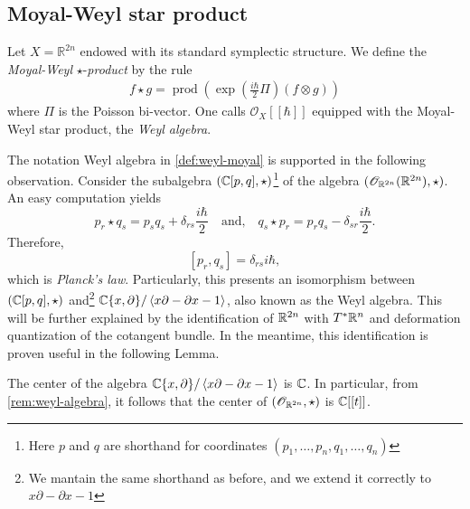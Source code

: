\subsection{Moyal-Weyl star product}
\begin{definition}\label{def:weyl-moyal}
	Let $X = \mathbb{R}^{2n}$ endowed with its standard symplectic structure. We define the \textit{Moyal-Weyl} $\star$-\textit{product} by the rule
    \begin{align}\label{eqn:weyl-moyal-free}
    	f \star g=\operatorname{prod}\left(\exp \left(\frac{i\hbar}{2}\Pi\right)(f \otimes g)\right)
    \end{align}
	where $\Pi$ is the Poisson bi-vector. One calls $\mathscr{O}_X[[\hbar]]$ equipped with the Moyal-Weyl star product, the \textit{Weyl algebra}.
\end{definition}
\begin{remark}\label{rem:weyl-algebra}
	The notation Weyl algebra in \cref{def:weyl-moyal} is supported in the following observation. Consider the subalgebra $({\mathbb C}[p,q], \star)$\footnote{Here $p$ and $q$ are shorthand for coordinates $(p_{1}, \ldots, p_{n}, q_{1}, \ldots, q_{n})$} of the algebra $(\mathscr{O}_{{\mathbb R}^{2n}}({\mathbb R}^{2n}), \star)$. An easy computation yields 
	\[
		p_{r} \star q_{s} = p_{s}q_{s} + \delta_{rs}\frac{i\hbar}{2} \quad \text{and,} \quad q_{s} \star p_{r} = p_{r}q_{s} - \delta_{sr}\frac{i\hbar}{2}.
	\]
	Therefore,
	\[
		[p_{r},q_{s}] = \delta_{rs}i\hbar,
	\]
	which is \textit{Planck’s law}. Particularly, this presents an isomorphism between $({\mathbb C}[p,q],\star)$ and\footnote{We mantain the same shorthand as before, and we extend it correctly to $x\partial - \partial x - 1$} ${\mathbb C}\{x,\partial\}/\left\langle x\partial - \partial x - 1\right\rangle$, also known as the Weyl algebra. This will be further explained by the identification of ${\mathbb R}^{2n}$ with $T^{*}{\mathbb R}^{n}$ and deformation quantization of the cotangent bundle. In the meantime, this identification is proven useful in the following Lemma. 
\end{remark}
\begin{lemma}\label{lemm:center-weyl-algebra}
	The center of the algebra ${\mathbb C}\{x,\partial\}/\left\langle x\partial - \partial x - 1\right\rangle$ is ${\mathbb C}$. In particular, from \cref{rem:weyl-algebra}, it follows that the center of $(\mathscr{O}_{{\mathbb R}^{2n}}, \star)$ is ${\mathbb C}[[t]]$.
\end{lemma}
